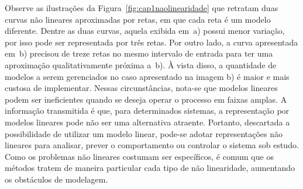 \par 
Observe as ilustrações da Figura~\ref{fig:cap1naolinearidade} que retratam duas curvas não lineares aproximadas por retas, em que cada reta é um modelo diferente. Dentre as duas curvas, aquela exibida em~a) possui menor variação, por isso pode ser representada por três retas. Por outro lado, a curva apresentada em~b) precisou de treze retas no mesmo intervalo de entrada para ter uma aproximação qualitativamente próxima a~b). À vista disso, a quantidade de modelos a serem gerenciados no caso apresentado na imagem b) é maior e mais custosa de implementar. Nessas circunstâncias, nota-se que modelos lineares podem ser ineficientes quando se deseja operar o processo em faixas amplas. A informação transmitida é que, para determinados sistemas, a representação por modelos lineares pode não ser uma alternativa atraente. Portanto, descartada a possibilidade de utilizar um modelo linear, pode-se adotar representações não lineares para analisar, prever o comportamento ou controlar o sistema sob estudo. Como os problemas não lineares costumam ser específicos, é comum que os métodos tratem de maneira particular cada tipo de não linearidade, aumentando os obstáculos de modelagem. 
%
